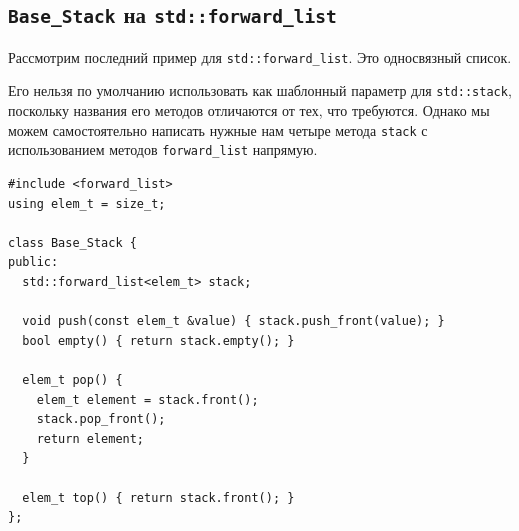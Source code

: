 \subsection{\texttt{Base_Stack} на \texttt{std::forward_list}}

Рассмотрим последний пример для \texttt{std::forward_list}. Это односвязный список. 
\begin{mdframed}[style=mdfStyleCode]%
  \begin{remark}\rm%
  Его нельзя по умолчанию использовать как шаблонный параметр для \texttt{std::stack}, поскольку названия его методов отличаются от тех, что требуются. Однако мы можем самостоятельно написать нужные нам четыре метода \texttt{stack} с использованием методов \texttt{forward_list} напрямую. 
\end{remark}
\end{mdframed}


\begin{verbatim}
#include <forward_list>
using elem_t = size_t;

class Base_Stack {
public:
  std::forward_list<elem_t> stack;

  void push(const elem_t &value) { stack.push_front(value); }
  bool empty() { return stack.empty(); }

  elem_t pop() {
    elem_t element = stack.front();
    stack.pop_front();
    return element;
  }

  elem_t top() { return stack.front(); }
};
\end{verbatim}

